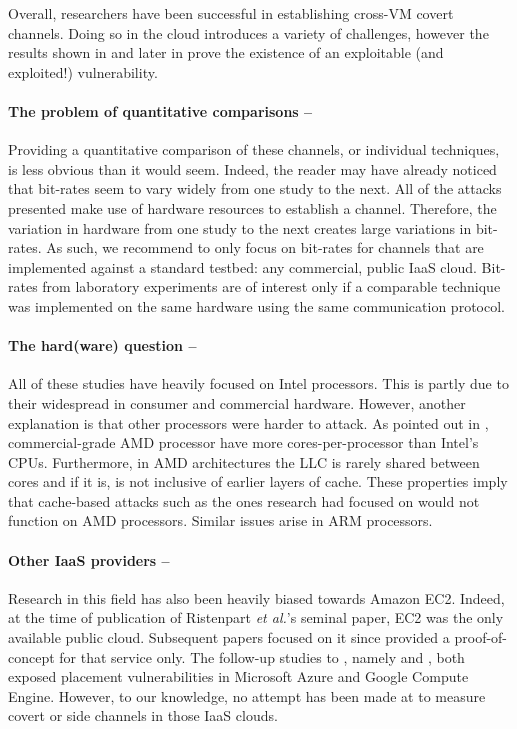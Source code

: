 \documentclass[orivec,envcountsame, a4paper, 11pt]{llncs}
\begin{document}
Overall, researchers have been successful in establishing cross-VM covert channels. Doing so in the cloud introduces a variety of challenges, however the results shown in \cite{Wu2012} and later in \cite{Maurice2017} prove the existence of an exploitable (and exploited!) vulnerability.

\paragraph{The problem of quantitative comparisons -- } Providing a quantitative comparison of these channels, or individual techniques, is less obvious than it would seem. Indeed, the reader may have already noticed that bit-rates seem to vary widely from one study to the next. All of the attacks presented make use of hardware resources to establish a channel. Therefore, the variation in hardware from one study to the next creates large variations in bit-rates. As such, we recommend to only focus on bit-rates for channels that are implemented against a standard testbed: any commercial, public IaaS cloud. Bit-rates from laboratory experiments are of interest only if a comparable technique was implemented on the same hardware using the same communication protocol.

\paragraph{The hard(ware) question --} All of these studies have heavily focused on Intel processors. This is partly due to their widespread in consumer and commercial hardware. However, another explanation is that other processors were harder to attack. As pointed out in \cite{Irazoqui2016}, commercial-grade AMD processor have more cores-per-processor than Intel's CPUs. Furthermore, in AMD architectures the LLC is rarely shared between cores and if it is, is not inclusive of earlier layers of cache. These properties imply that cache-based attacks such as the ones research had focused on would not function on AMD processors. Similar issues arise in ARM processors.

\paragraph{Other IaaS providers --} Research in this field has also been heavily biased towards Amazon EC2. Indeed, at the time of publication of Ristenpart \textit{et al.}'s \cite{Ristenpart2009} seminal paper, EC2 was the only available public cloud. Subsequent papers focused on it since \cite{Ristenpart2009} provided a proof-of-concept for that service only. The follow-up studies to \cite{Ristenpart2009}, namely \cite{Varadarajan2015} and \cite{Xu2015}, both exposed placement vulnerabilities in Microsoft Azure and Google Compute Engine. However, to our knowledge, no attempt has been made at to measure covert or side channels in those IaaS clouds. 
\end{document}
